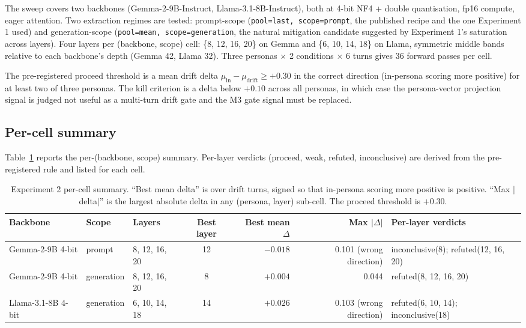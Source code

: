 The sweep covers two backbones (Gemma-2-9B-Instruct, Llama-3.1-8B-Instruct), both at 4-bit NF4 + double quantisation, fp16 compute, eager attention. Two extraction regimes are tested: prompt-scope (\texttt{pool=last, scope=prompt}, the published recipe and the one Experiment 1 used) and generation-scope (\texttt{pool=mean, scope=generation}, the natural mitigation candidate suggested by Experiment 1's \auroc{} saturation across layers). Four layers per (backbone, scope) cell: \{8, 12, 16, 20\} on Gemma and \{6, 10, 14, 18\} on Llama, symmetric middle bands relative to each backbone's depth (Gemma 42, Llama 32). Three personas $\times$ 2 conditions $\times$ 6 turns gives 36 forward passes per cell.

The pre-registered proceed threshold is a mean drift delta $\mu_{\text{in}} - \mu_{\text{drift}} \geq +0.30$ in the correct direction (in-persona scoring more positive) for at least two of three personas. The kill criterion is a delta below $+0.10$ across all personas, in which case the persona-vector projection signal is judged not useful as a multi-turn drift gate and the M3 gate signal must be replaced.

\subsection{Per-cell summary}

Table~\ref{tab:experiment-2-summary} reports the per-(backbone, scope) summary. Per-layer verdicts (proceed, weak, refuted, inconclusive) are derived from the pre-registered rule and listed for each cell.

\begin{table}[H]
  \centering
  \small
  \caption{Experiment 2 per-cell summary. ``Best mean delta'' is over drift turns, signed so that in-persona scoring more positive is positive. ``Max $\lvert$delta$\rvert$'' is the largest absolute delta in any (persona, layer) sub-cell. The proceed threshold is $+0.30$.}
  \label{tab:experiment-2-summary}
  \begin{tabularx}{\textwidth}{l l l c r r X}
    \toprule
    \textbf{Backbone} & \textbf{Scope} & \textbf{Layers} & \textbf{Best layer} & \textbf{Best mean $\Delta$} & \textbf{Max $\lvert\Delta\rvert$} & \textbf{Per-layer verdicts} \\
    \midrule
    Gemma-2-9B 4-bit  & prompt     & 8, 12, 16, 20 & 12 & $-0.018$ & 0.101 (wrong direction) & inconclusive(8); refuted(12, 16, 20) \\
    Gemma-2-9B 4-bit  & generation & 8, 12, 16, 20 & 8  & $+0.004$ & 0.044                   & refuted(8, 12, 16, 20)               \\
    Llama-3.1-8B 4-bit & generation & 6, 10, 14, 18 & 14 & $+0.026$ & 0.103 (wrong direction) & refuted(6, 10, 14); inconclusive(18) \\
    \bottomrule
  \end{tabularx}
\end{table}

